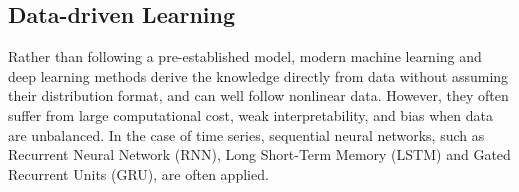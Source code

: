 \subsection{Data-driven Learning}

Rather than following a pre-established model, modern machine learning and deep learning methods derive the knowledge directly from data  
without assuming their distribution format, and can well follow nonlinear data. However, they often suffer from large computational cost, weak interpretability,  and bias when data are unbalanced. In the case of time series, %
sequential neural networks, such as Recurrent Neural Network (RNN), Long Short-Term Memory (LSTM) and Gated Recurrent Units (GRU), are often applied. 




